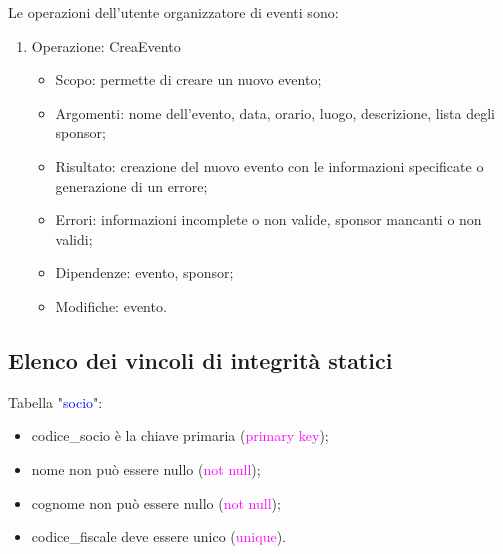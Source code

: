 \documentclass{article}
\begin{document}
\begin{flushleft}
\begin{enumerate}
        \end{enumerate}
        \newpage
        Le operazioni dell'utente organizzatore di eventi sono:
        \begin{enumerate}
            \item Operazione: CreaEvento \\
            \begin{itemize}
                \item Scopo: permette di creare un nuovo evento;
                \item Argomenti: nome dell'evento, data, orario, luogo, descrizione, lista degli sponsor;
                \item Risultato: creazione del nuovo evento con le informazioni specificate o generazione di un errore;
                \item Errori: informazioni incomplete o non valide, sponsor mancanti o non validi;
                \item Dipendenze: evento, sponsor;
                \item Modifiche: evento.
            \end{itemize}
        \end{enumerate}
    \end{flushleft}

\subsection{Elenco dei vincoli di integrità statici}

    \begin{flushleft}
        Tabella "\textcolor{blue}{socio}": \\
        \begin{itemize}
            \item codice\_socio è la chiave primaria (\textcolor{magenta}{primary key}); \\
            \item nome non può essere nullo (\textcolor{magenta}{not null}); \\
            \item cognome non può essere nullo (\textcolor{magenta}{not null}); \\
            \item codice\_fiscale deve essere unico (\textcolor{magenta}{unique}). \\
        \end{itemize}        
    \end{flushleft}
\end{document}
